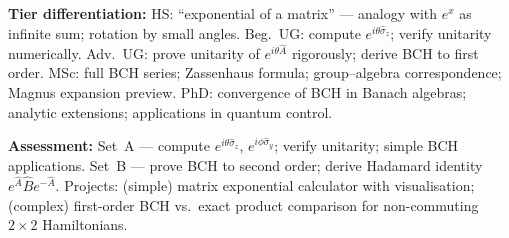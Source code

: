 \documentclass[11pt,a4paper]{article}
\begin{document}
\begin{tcolorbox}[modulebox, title={Module~I.1 / L04: Operator Algebra and the Exponential Map}]
\medskip\textbf{Tier differentiation:}
HS: ``exponential of a matrix'' --- analogy with $e^x$ as infinite sum; rotation by small angles.
Beg.\ UG: compute $e^{i\theta\hat{\sigma}_z}$; verify unitarity numerically.
Adv.\ UG: prove unitarity of $e^{i\theta\hat{A}}$ rigorously; derive BCH to first order.
MSc: full BCH series; Zassenhaus formula; group--algebra correspondence; Magnus expansion preview.
PhD: convergence of BCH in Banach algebras; analytic extensions; applications in quantum control.

\medskip\textbf{Assessment:}
Set~A --- compute $e^{i\theta\hat{\sigma}_z}$, $e^{i\phi\hat{\sigma}_y}$; verify unitarity; simple BCH applications.
Set~B --- prove BCH to second order; derive Hadamard identity $e^{\hat{A}}\hat{B}e^{-\hat{A}}$.
Projects: (simple) matrix exponential calculator with visualisation; (complex) first-order BCH vs.\ exact
product comparison for non-commuting $2\times 2$ Hamiltonians.
\end{tcolorbox}

\medskip
\end{document}
